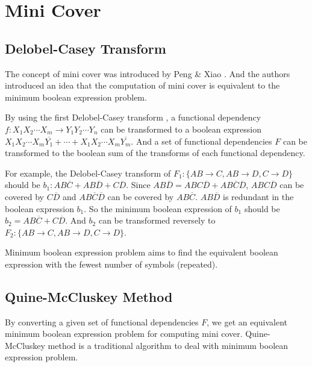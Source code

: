 \documentclass[11pt]{book}
\begin{document}
\section{Mini Cover}

\subsection{Delobel-Casey Transform}

The concept of mini cover was introduced by Peng \& Xiao \cite{peng2016optimal}. And the authors introduced an idea that the computation of mini cover is equivalent to the minimum boolean expression problem.

By using the first Delobel-Casey transform \cite{delobel1973decomposition}, a functional dependency $f: X_1 X_2 \cdots X_m \rightarrow Y_1 Y_2 \cdots Y_n$ can be transformed to a boolean expression $X_1 X_2 \cdots X_m \overline{Y_1} + \cdots + X_1 X_2 \cdots X_m \overline{Y_m}$. And a set of functional dependencies $F$ can be transformed to the boolean sum of the transforms of each functional dependency.

For example, the Delobel-Casey transform of $F_1: \{ AB \rightarrow C, AB \rightarrow D, C \rightarrow D \}$ should be $b_1: AB\overline{C} + AB\overline{D} + C\overline{D}$. Since $AB\overline{D} = ABC\overline{D} + AB\overline{C}\overline{D}$, $ABC\overline{D}$ can be covered by $C\overline{D}$ and $AB\overline{C}\overline{D}$ can be covered by $AB\overline{C}$. $AB\overline{D}$ is redundant in the boolean expression $b_1$. So the minimum boolean expression of $b_1$ should be $b_2 = AB\overline{C} + C\overline{D}$. And $b_2$ can be transformed reversely to $F_2: \{ AB \rightarrow C, AB \rightarrow D, C \rightarrow D \}$.

Minimum boolean expression problem aims to find the equivalent boolean expression with the fewest number of symbols (repeated).

\subsection{Quine-McCluskey Method}

By converting a given set of functional dependencies $F$, we get an equivalent minimum boolean expression problem for computing mini cover. Quine-McCluskey method \cite{mccluskey1956minimization} is a traditional algorithm to deal with minimum boolean expression problem.
\end{document}
